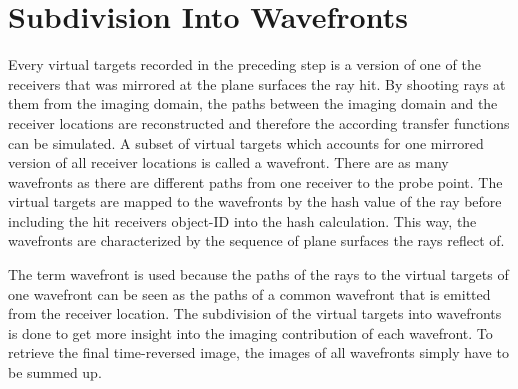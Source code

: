 \section{Subdivision Into Wavefronts}\label{section:subdivision_into_wavefronts}

Every virtual targets recorded in the preceding step is a version of one of the receivers that was mirrored at the plane surfaces the ray hit.
By shooting rays at them from the imaging domain, the paths between the imaging domain and the receiver locations are reconstructed and therefore the according transfer functions can be simulated.
A subset of virtual targets which accounts for one mirrored version of all receiver locations is called a wavefront.
There are as many wavefronts as there are different paths from one receiver to the probe point.
The virtual targets are mapped to the wavefronts by the hash value of the ray before including the hit receivers object-ID into the hash calculation.
This way, the wavefronts are characterized by the sequence of plane surfaces the rays reflect of.

The term wavefront is used because the paths of the rays to the virtual targets of one wavefront can be seen as the paths of a common wavefront that is emitted from the receiver location.
The subdivision of the virtual targets into wavefronts is done to get more insight into the imaging contribution of each wavefront.
To retrieve the final time-reversed image, the images of all wavefronts simply have to be summed up.
